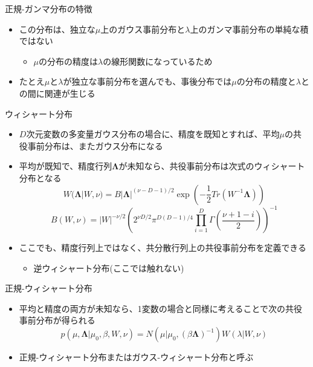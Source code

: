 \begin{frame}{正規-ガンマ分布の特徴}
 \begin{itemize}
  \item この分布は、独立な$\mu$上のガウス事前分布と$\lambda$上のガンマ事前分布の単純な積ではない
        \begin{itemize}
         \item $\mu$の分布の精度は$\lambda$の線形関数になっているため
        \end{itemize}
  \item たとえ$\mu$と$\lambda$が独立な事前分布を選んでも、事後分布では$\mu$の分布の精度と$\lambda$との間に関連が生じる
 \end{itemize}
\end{frame}

\begin{frame}{ウィシャート分布}
 \begin{itemize}
  \item $D$次元変数の多変量ガウス分布の場合に、\alert{精度を既知}とすれば、平均$\mu$の共役事前分布は、またガウス分布になる
  \item \alert{平均が既知}で、精度行列$\bm{\Lambda}$が未知なら、共役事前分布は次式のウィシャート分布となる
        \begin{equation}
         W(\bm{\Lambda}|W,\nu) = B|\bm{\Lambda}|^{(\nu-D-1)/2}\exp\left(-\frac{1}{2}Tr(W^{-1}\bm{\Lambda})\right)
        \end{equation}
        \begin{equation}
         B(W,\nu) = |W|^{-\nu/2}\left(2^{\nu D/2}\pi^{D(D-1)/4}\prod_{i=1}^D\Gamma\left(\frac{\nu+1-i}{2}\right)\right)^{-1}
        \end{equation}
  \item ここでも、精度行列上ではなく、共分散行列上の共役事前分布を定義できる
        \begin{itemize}
         \item 逆ウィシャート分布(ここでは触れない)
        \end{itemize}
 \end{itemize}
\end{frame}

\begin{frame}{正規-ウィシャート分布}
 \begin{itemize}
  \item \alert{平均と精度の両方が未知}なら、1変数の場合と同様に考えることで次の共役事前分布が得られる
        \begin{equation}
         p(\mu,\bm{\Lambda}|\mu_0,\beta,W,\nu) = N(\mu|\mu_0,(\beta\bm{\Lambda})^{-1})W(\lambda|W,\nu)
        \end{equation}
  \item \alert{正規-ウィシャート分布}または\alert{ガウス-ウィシャート分布}と呼ぶ
 \end{itemize}
\end{frame}
